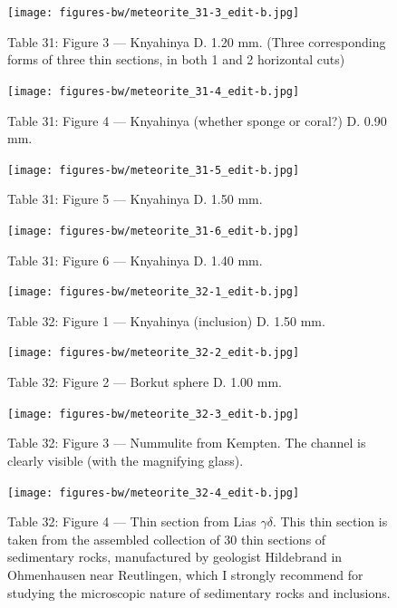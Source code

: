 \documentclass[a4paper, 12pt, oneside]{article}
\begin{document}
\clearpage
\begin{figure}[t]
\texttt{[image: figures-bw/meteorite\_31-3\_edit-b.jpg]}
\caption{Table 31: Figure 3 --- Knyahinya D. 1.20 mm. (Three corresponding forms of three thin sections, in both 1 and 2 horizontal cuts)}
\centering
\end{figure}
\clearpage
\begin{figure}[t]
\texttt{[image: figures-bw/meteorite\_31-4\_edit-b.jpg]}
\caption{Table 31: Figure 4 --- Knyahinya (whether sponge or coral?) D. 0.90 mm.}
\centering
\end{figure}
\clearpage
\begin{figure}[t]
\texttt{[image: figures-bw/meteorite\_31-5\_edit-b.jpg]}
\caption{Table 31: Figure 5 --- Knyahinya D. 1.50 mm.}
\centering
\end{figure}
\clearpage
\begin{figure}[t]
\texttt{[image: figures-bw/meteorite\_31-6\_edit-b.jpg]}
\caption{Table 31: Figure 6 --- Knyahinya D. 1.40 mm.}
\centering
\end{figure}
\clearpage
{}
\begin{figure}[t]
\texttt{[image: figures-bw/meteorite\_32-1\_edit-b.jpg]}
\caption{Table 32: Figure 1 --- Knyahinya (inclusion) D. 1.50 mm.}
\centering
\end{figure}
\clearpage
\begin{figure}[t]
\texttt{[image: figures-bw/meteorite\_32-2\_edit-b.jpg]}
\caption{Table 32: Figure 2 --- Borkut sphere D. 1.00 mm.}
\centering
\end{figure}
\clearpage
\begin{figure}[t]
\texttt{[image: figures-bw/meteorite\_32-3\_edit-b.jpg]}
\caption{Table 32: Figure 3 --- Nummulite from Kempten. The channel is clearly visible (with the magnifying glass).}
\centering
\end{figure}
\clearpage
\begin{figure}[t]
\texttt{[image: figures-bw/meteorite\_32-4\_edit-b.jpg]}
\caption{Table 32: Figure 4 --- Thin section from Lias $\gamma\delta$. This thin section is taken from the assembled collection of 30 thin sections of sedimentary rocks, manufactured by geologist Hildebrand in Ohmenhausen near Reutlingen, which I strongly recommend for studying the microscopic nature of sedimentary rocks and inclusions.}
\centering
\end{figure}
\end{document}

